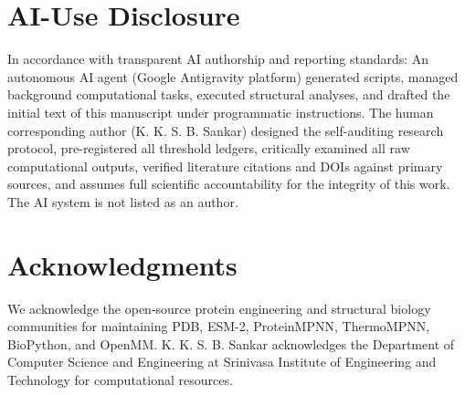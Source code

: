 \documentclass[10pt,twocolumn]{article}
\begin{document}
\section{AI-Use Disclosure}

In accordance with transparent AI authorship and reporting standards:
An autonomous AI agent (Google Antigravity platform) generated scripts, managed background computational tasks, executed structural analyses, and drafted the initial text of this manuscript under programmatic instructions. The human corresponding author (K. K. S. B. Sankar) designed the self-auditing research protocol, pre-registered all threshold ledgers, critically examined all raw computational outputs, verified literature citations and DOIs against primary sources, and assumes full scientific accountability for the integrity of this work. The AI system is not listed as an author.

\section{Acknowledgments}

We acknowledge the open-source protein engineering and structural biology communities for maintaining PDB, ESM-2, ProteinMPNN, ThermoMPNN, BioPython, and OpenMM. K. K. S. B. Sankar acknowledges the Department of Computer Science and Engineering at Srinivasa Institute of Engineering and Technology for computational resources.
\end{document}
